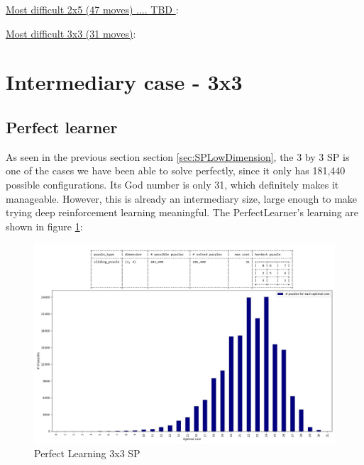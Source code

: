 \underline{Most difficult 2x5 (47 moves) .... TBD }:
\begin{center}
\begin{nine}
\end{nine}
\end{center}
\underline{Most difficult 3x3 (31 moves)}:
\begin{center}
\begin{eight}
\end{eight}
\end{center}



\section{Intermediary case - 3x3}
\label{S33}


\subsection{Perfect learner}
As seen in the previous section section \ref{sec:SPLowDimension}, the 3 by 3 SP is one of the cases we have been able to solve perfectly, since it only has 181,440 possible configurations. Its God number is only 31, which definitely makes it manageable. However, this is already an intermediary size, large enough to make trying deep reinforcement learning meaningful. The PerfectLearner's learning are shown in figure \ref{fig:33SPPerfectLearning}:


\begin{landscape}
\centering\vspace*{\fill}
\begin{figure}[H]
\centering
\includegraphics[scale=0.7]{./Figures/33SPPerfectLearning.jpeg}
\caption[33SPPerfectLearning]{Perfect Learning 3x3 SP}
\label{fig:33SPPerfectLearning}
\end{figure}
\vfill
\end{landscape}
\restoregeometry




